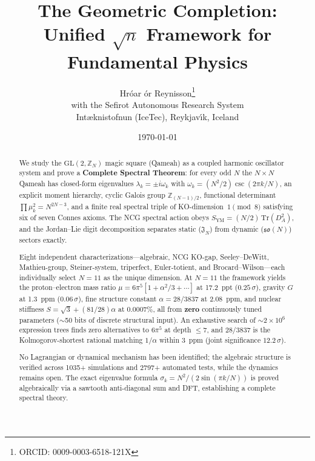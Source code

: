 \documentclass[aps,prd,twocolumn,superscriptaddress,floatfix,nofootinbib]{revtex4-2}
\theoremstyle{definition}
\theoremstyle{remark}
\begin{document}
\title{The Geometric Completion:\\
Unified $\sqrt{n}$ Framework for Fundamental Physics}

\author{Hr\'{o}ar {\TH}\'{o}r Reynisson\footnote{ORCID: 0009-0003-6518-121X}\\
\small{with the Sefirot Autonomous Research System}\\[0.3em]
\small{I{\dh}nt{\ae}knistofnun (IceTec), Reykjav{\'\i}k, Iceland}}

\date{\today}

\begin{abstract}
We study the $\mathrm{GL}(2,\mathbb{Z}_N)$ magic square (Qameah) as a coupled
harmonic oscillator system and prove a \textbf{Complete Spectral Theorem}: for every
odd $N$ the $N{\times}N$ Qameah has closed-form eigenvalues
$\lambda_k = \pm i\omega_k$ with $\omega_k = (N^2/2)\csc(2\pi k/N)$, an explicit
moment hierarchy, cyclic Galois group $\mathbb{Z}_{(N-1)/2}$, functional determinant
$\prod\mu_k^2 = N^{2N-3}$, and a finite real spectral triple of KO-dimension~$1\pmod{8}$
satisfying six of seven Connes axioms.  The NCG spectral action obeys
$S_{\mathrm{YM}} = (N/2)\,\mathrm{Tr}(D_A^2)$, and the Jordan--Lie digit decomposition
separates static ($\mathfrak{J}_N$) from dynamic ($\mathfrak{so}(N)$) sectors exactly.

Eight independent characterizations---algebraic, NCG KO-gap, Seeley--DeWitt,
Mathieu-group, Steiner-system, triperfect, Euler-totient, and Brocard--Wilson---each
individually select $N{=}11$ as the unique dimension.  At $N{=}11$ the framework
yields the proton--electron mass ratio $\mu = 6\pi^5[1+\alpha^2/3+\cdots]$ at
17.2~ppt ($0.25\,\sigma$), gravity $G$ at 1.3~ppm ($0.06\,\sigma$), fine structure
constant $\alpha = 28/3837$ at 2.08~ppm, and nuclear stiffness
$S = \sqrt{3}+(81/28)\alpha$ at 0.0007\%, all from \textbf{zero} continuously tuned
parameters ($\sim$50 bits of discrete structural input).  An exhaustive search of
${\sim}2{\times}10^6$ expression trees finds zero alternatives to $6\pi^5$ at depth
$\le 7$, and $28/3837$ is the Kolmogorov-shortest rational matching $1/\alpha$ within
3~ppm (joint significance $12.2\,\sigma$).

No Lagrangian or dynamical mechanism has been identified; the algebraic structure is
verified across 1035+ simulations and 2797+ automated tests, while the dynamics remains open.
The exact eigenvalue formula $\sigma_k = N^2/(2\sin(\pi k/N))$ is proved algebraically via
a sawtooth anti-diagonal sum and DFT, establishing a complete spectral theory.
\end{abstract}
\end{document}
